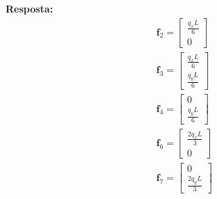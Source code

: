 %
\color{blue}
\textbf{Resposta:}
\begin{equation}
	\begin{split}
		&\mathbf{f}_2 =
		\begin{bmatrix}
			\frac{q_x L}{6}\\
			0
		\end{bmatrix}\\
		&\mathbf{f}_3 =
		\begin{bmatrix}
		\frac{q_x L}{6}\\
		\frac{q_y L}{6}
		\end{bmatrix}\\
		&\mathbf{f}_4 =
		\begin{bmatrix}
		0\\
		\frac{q_y L}{6}
		\end{bmatrix}\\
		&\mathbf{f}_6 =
		\begin{bmatrix}
		\frac{2 q_x L}{3}\\
		0
		\end{bmatrix}\\
		&\mathbf{f}_7 =
		\begin{bmatrix}
		0\\
		\frac{2 q_y L}{3}
		\end{bmatrix}
	\end{split}
\end{equation}
\color{black}


